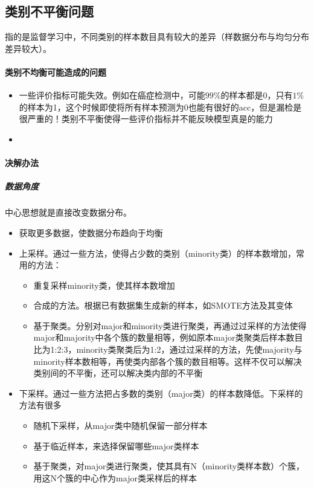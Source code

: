\subsection{类别不平衡问题}
指的是监督学习中，不同类别的样本数目具有较大的差异（样数据分布与均匀分布差异较大）。
\paragraph{类别不均衡可能造成的问题}
\begin{itemize}
	\item 一些评价指标可能失效。例如在癌症检测中，可能$99\%$的样本都是0，只有$1\%$的样本为1，这个时候即使将所有样本预测为0也能有很好的acc，但是漏检是很严重的！类别不平衡使得一些评价指标并不能反映模型真是的能力
	\item 
\end{itemize}

\paragraph{决解办法}
\subparagraph{数据角度}
中心思想就是直接改变数据分布。
\begin{itemize}
	\item 获取更多数据，使数据分布趋向于均衡
	\item 上采样。通过一些方法，使得占少数的类别（minority类）的样本数增加，常用的方法：
	\begin{itemize}
		\item 重复采样minority类，使其样本数增加
		\item 合成的方法。根据已有数据集生成新的样本，如SMOTE方法及其变体
		\item 基于聚类。分别对major和minority类进行聚类，再通过过采样的方法使得major和majority中各个簇的数量相等，例如原本major类聚类后样本数目比为1:2:3，minority类聚类后为1:2，通过过采样的方法，先使majority与minority样本数相等，再使类内部各个簇的数目相等。这样不仅可以解决类别间的不平衡，还可以解决类内部的不平衡
	\end{itemize}
	\item 下采样。通过一些方法把占多数的类别（major类）的样本数降低。下采样的方法有很多
	\begin{itemize}
		\item 随机下采样，从major类中随机保留一部分样本
		\item 基于临近样本，来选择保留哪些major类样本
		\item 基于聚类，对major类进行聚类，使其具有N（minority类样本数）个簇，用这N个簇的中心作为major类采样后的样本
	\end{itemize}
\end{itemize}

